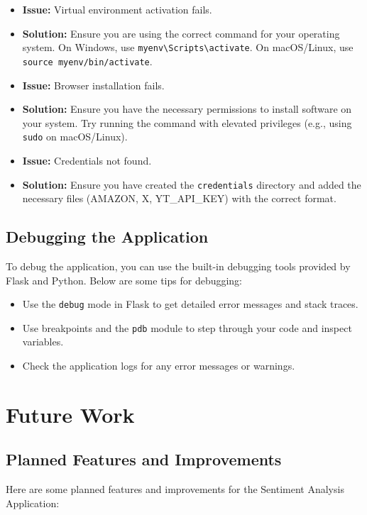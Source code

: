 \documentclass[a4paper]{article}
\begin{document}
\begin{itemize}
    \item \textbf{Issue:} Virtual environment activation fails.
    \item \textbf{Solution:} Ensure you are using the correct command for your operating system. On Windows, use \texttt{myenv\textbackslash Scripts\textbackslash activate}. On macOS/Linux, use \texttt{source myenv/bin/activate}.
    
    \item \textbf{Issue:} Browser installation fails.
    \item \textbf{Solution:} Ensure you have the necessary permissions to install software on your system. Try running the command with elevated privileges (e.g., using \texttt{sudo} on macOS/Linux).
    
    \item \textbf{Issue:} Credentials not found.
    \item \textbf{Solution:} Ensure you have created the \texttt{credentials} directory and added the necessary files (AMAZON, X, YT\_API\_KEY) with the correct format.
\end{itemize}

\subsection{Debugging the Application}
To debug the application, you can use the built-in debugging tools provided by Flask and Python. Below are some tips for debugging:

\begin{itemize}
    \item Use the \texttt{debug} mode in Flask to get detailed error messages and stack traces.
    \item Use breakpoints and the \texttt{pdb} module to step through your code and inspect variables.
    \item Check the application logs for any error messages or warnings.
\end{itemize}

\section{Future Work}
\subsection{Planned Features and Improvements}
Here are some planned features and improvements for the Sentiment Analysis Application:
\end{document}
